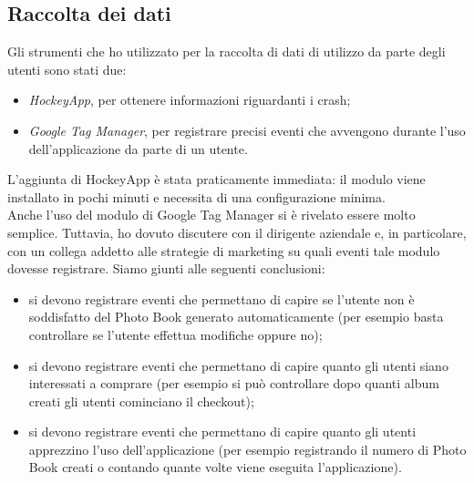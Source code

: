 		\subsection{Raccolta dei dati}
			Gli strumenti che ho utilizzato per la raccolta di dati di utilizzo da parte degli utenti sono stati due:
			\begin{itemize}
				\item \emph{HockeyApp}, per ottenere informazioni riguardanti i crash;
				\item \emph{Google Tag Manager}, per registrare precisi eventi che avvengono durante l'uso dell'applicazione da parte
				di un utente.
			\end{itemize}
			L'aggiunta di HockeyApp è stata praticamente immediata: il modulo viene installato in pochi minuti e necessita di una
			configurazione minima.\\
			Anche l'uso del modulo di Google Tag Manager si è rivelato essere molto semplice. Tuttavia, ho dovuto discutere con il
			dirigente aziendale e, in particolare, con un collega addetto alle strategie di marketing su quali eventi tale modulo dovesse
			registrare. Siamo giunti alle seguenti conclusioni:
			\begin{itemize}
				\item si devono registrare eventi che permettano di capire se l'utente non è soddisfatto del Photo Book generato
				automaticamente (per esempio basta controllare se l'utente effettua modifiche oppure no);
				\item si devono registrare eventi che permettano di capire quanto gli utenti siano interessati a comprare (per
				esempio si può controllare dopo quanti album creati gli utenti cominciano il checkout);
				\item si devono registrare eventi che permettano di capire quanto gli utenti apprezzino l'uso dell'applicazione
				(per esempio registrando il numero di Photo Book creati o contando quante volte viene eseguita l'applicazione).
			\end{itemize}
